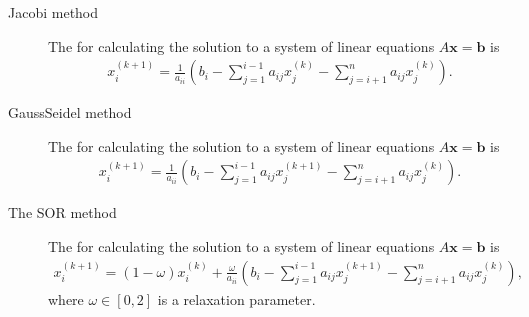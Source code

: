 \documentclass[letterpaper,10pt,english]{jupyterBook}
\begin{document}
\begin{description}
\item[{Jacobi method\label{\detokenize{8_Appendices/8.0_Cheat_sheet:term-Jacobi-method}}}] \leavevmode
\sphinxAtStartPar
The {\hyperref[\detokenize{7_Indirect_methods/7.1_Jacobi_method:jacobi-method-section}]{}} for calculating the solution to a system of linear equations \(A \mathbf{x} = \mathbf{b}\) is
\begin{align*}
    x_i^{(k+1)} = \frac{1}{a_{ii}} \left( b_i - \sum_{j = 1}^{i-1} a_{ij} x_j^{(k)} - \sum_{j = i+1}^n a_{ij} x_j^{(k)} \right).
\end{align*}
\item[{Gauss\sphinxhyphen{}Seidel method\label{\detokenize{8_Appendices/8.0_Cheat_sheet:term-Gauss-Seidel-method}}}] \leavevmode
\sphinxAtStartPar
The {\hyperref[\detokenize{7_Indirect_methods/7.2_Gauss_Seidel_method:gauss-seidel-method-section}]{}} for calculating the solution to a system of linear equations \(A \mathbf{x} = \mathbf{b}\) is
\begin{align*}
    x_i^{(k+1)} = \frac{1}{a_{ii} }\left(b_i - \sum_{j=1}^{i-1} a_{ij} x_j^{(k+1)} -\sum_{j=i+1}^n a_{ij} x_j^{(k)} \right).
\end{align*}
\item[{The SOR method\label{\detokenize{8_Appendices/8.0_Cheat_sheet:term-The-SOR-method}}}] \leavevmode
\sphinxAtStartPar
The {\hyperref[\detokenize{7_Indirect_methods/7.4_SOR_method:sor-method-section}]{}} for calculating the solution to a system of linear equations \(A \mathbf{x} = \mathbf{b}\) is
\begin{align*}
    x_i^{(k+1)} =(1 - \omega) x_i^{(k)} + \frac{\omega}{a_{ii} }\left(b_i - \sum_{j=1}^{i-1} a_{ij} x_j^{(k+1)} -\sum_{j=i+1}^n a_{ij} x_j^{(k)} \right),
\end{align*}
\sphinxAtStartPar
where \(\omega \in [0, 2]\) is a relaxation parameter.


\end{description}
\end{document}
